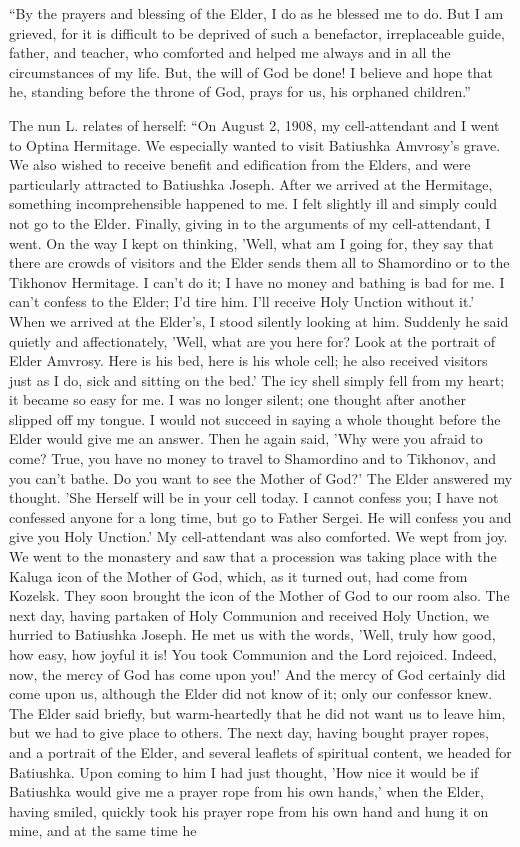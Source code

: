 “By the prayers and blessing of the Elder, I do as he blessed me to do. But I am grieved, for it is difficult to be deprived of such a benefactor, irreplaceable guide, father, and teacher, who comforted and helped me always and in all the circumstances of my life. But, the will of God be done! I believe and hope that he, standing before the throne of God, prays for us, his orphaned children.”

The nun L. relates of herself: “On August 2, 1908, my cell-attendant and I went to Optina Hermitage. We especially wanted to visit Batiushka Amvrosy’s grave. We also wished to receive benefit and edification from the Elders, and were particularly attracted to Batiushka Joseph. After we arrived at the Hermitage, something incomprehensible happened to me. I felt slightly ill and simply could not go to the Elder. Finally, giving in to the arguments of my cell-attendant, I went. On the way I kept on thinking, 'Well, what am I going for, they say that there are crowds of visitors and the Elder sends them all to Shamordino or to the Tikhonov Hermitage. I can't do it; I have no money and bathing is bad for me. I can't confess to the Elder; I'd tire him. I'll receive Holy Unction without it.' When we arrived at the Elder's, I stood silently looking at him. Suddenly he said quietly and affectionately, 'Well, what are you here for? Look at the portrait of Elder Amvrosy. Here is his bed, here is his whole cell; he also received visitors just as I do, sick and sitting on the bed.' The icy shell simply fell from my heart; it became so easy for me. I was no longer silent; one thought after another slipped off my tongue. I would not succeed in saying a whole thought before the Elder would give me an answer. Then he again said, 'Why were you afraid to come? True, you have no money to travel to Shamordino and to Tikhonov, and you can't bathe. Do you want to see the Mother of God?' The Elder answered my thought. 'She Herself will be in your cell today. I cannot confess you; I have not confessed anyone for a long time, but go to Father Sergei. He will confess you and give you Holy Unction.' My cell-attendant was also comforted. We wept from joy. We went to the monastery and saw that a procession was taking place with the Kaluga icon of the Mother of God, which, as it turned out, had come from Kozelsk. They soon brought the icon of the Mother of God to our room also. The next day, having partaken of Holy Communion and received Holy Unction, we hurried to Batiushka Joseph. He met us with the words, 'Well, truly how good, how easy, how joyful it is! You took Communion and the Lord rejoiced. Indeed, now, the mercy of God has come upon you!' And the mercy of God certainly did come upon us, although the Elder did not know of it; only our confessor knew. The Elder said briefly, but warm-heartedly that he did not want us to leave him, but we had to give place to others. The next day, having bought prayer ropes, and a portrait of the Elder, and several leaflets of spiritual content, we headed for Batiushka. Upon coming to him I had just thought, 'How nice it would be if Batiushka would give me a prayer rope from his own hands,' when the Elder, having smiled, quickly took his prayer rope from his own hand and hung it on mine, and at the same time he 